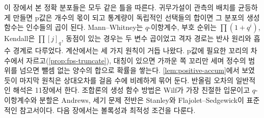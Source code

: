 이 장에서 본 정확 분포들은 모두 같은 틀을 따른다. 귀무가설이 관측의 배치를 균등하게 만들면 p값은 개수의 몫이 되고 통계량이 독립적인 선택들의 합이면 그 분포의 생성 함수는 인수들의 곱이 된다. Mann--Whitney는 $q$-이항계수, 부호 순위는 $\prod(1+q^i)$, Kendall은 $\prod[j]_q$, 동점이 있는 경우는 두 변수 곱이었고 격자 경로는 반사 원리와 흡수 경계로 다루었다. 계산에서는 세 가지 원칙이 거듭 나왔다. p값에 필요한 꼬리의 차수에서 자르고(\cref{prop:fps-truncate}), 대칭이 있으면 가까운 쪽 꼬리만 세며 정수의 범위를 넘으면 뺄셈 없는 양수의 합으로 확률을 쌓는다. \cref{lem:positive-accum}에서 보였듯이 마지막 원칙은 상대오차를 걸음 수에 비례하게 묶어 둔다. 반올림 오차의 일반적인 해석은 11장에서 한다. 조합론의 생성 함수 방법은 Wilf\cite{wilf2006gf}가 가장 친절한 입문이고 $q$-이항계수와 분할은 Andrews\cite{andrews1998partitions}, 세기 문제 전반은 Stanley\cite{stanley2012ec1}와 Flajolet--Sedgewick\cite{flajolet2009analytic}이 표준적인 참고서이다. 다음 장에서는 볼록성과 최적성 조건을 다룬다.

\chapterreferences
